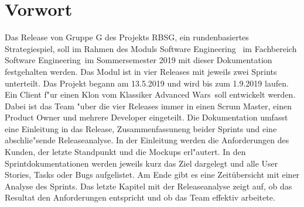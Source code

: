 \documentclass[12pt, titlepage]{scrartcl}
\newcommand{\RN}[1]{%
	\textup{\uppercase\expandafter{\romannumeral#1}}%
}
\begin{document}
	\section{Vorwort}
    	Das Release \RN{3} von Gruppe G des Projekts RBSG, ein rundenbasiertes Strategiespiel, soll im Rahmen des Moduls \glqq Software Engineering \RN{1}\grqq\ im Fachbereich \glqq Software Engineering\grqq\ im Sommersemester 2019 mit dieser Dokumentation festgehalten werden.
    	\vspace{0.3cm} \newline
        Das Modul ist in vier Releases mit jeweils zwei Sprints unterteilt. Das Projekt begann am 13.5.2019 und wird bis zum 1.9.2019 laufen. Ein Client f"ur einen Klon vom Klassiker \glqq Advanced Wars\grqq\ soll entwickelt werden. Dabei ist das Team "uber die vier Releases immer in einen Scrum Master, einen Product Owner und mehrere Developer eingeteilt.
        \vspace{0.3cm} \newline
        Die Dokumentation umfasst eine Einleitung in das Release, Zusammenfassuneng beider Sprints und eine abschlie"sende Releaseanalyse. In der Einleitung werden die Anforderungen des Kunden, der letzte Standpunkt und die Mockups erl"autert. In den Sprintdokumentationen werden jeweils kurz das Ziel dargelegt und alle User Stories, Tasks oder Bugs aufgelistet. Am Ende gibt es eine Zeit\"ubersicht mit einer Analyse des Sprints. Das letzte Kapitel mit der Releaseanalyse zeigt auf, ob das Resultat den Anforderungen entspricht und ob das Team effektiv arbeitete.
    \newpage
    \tableofcontents
    \newpage
\end{document}
